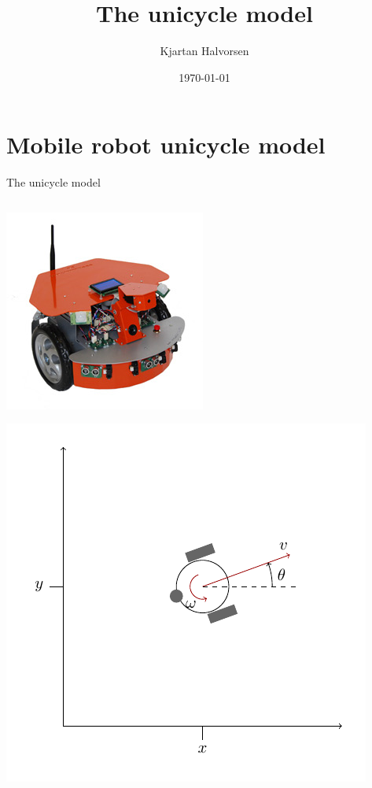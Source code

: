 \documentclass[presentation,aspectratio=169]{beamer}
\author{Kjartan Halvorsen}
\date{\today}
\title{The unicycle model}
\begin{document}
\maketitle

\section{Mobile robot unicycle model}
\label{sec:org9072577}

\begin{frame}[label={sec:org381172e}]{The unicycle model}
\begin{columns}
\begin{column}{0.4\columnwidth}
\begin{center}
 \includegraphics[width=.3\linewidth]{../figures/X80Pro.jpg}
\end{center}
\begin{center}
 \includegraphics[width=1.0\linewidth]{../figures/unicycle-model}
\end{center}
\end{column}


\end{columns}
\end{frame}
\end{document}
